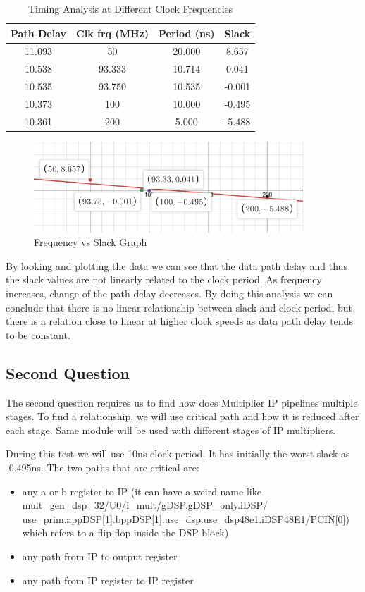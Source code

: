 \documentclass{report}
\begin{document}
\begin{table}[!h]
    \centering
    \caption{Timing Analysis at Different Clock Frequencies}
    \begin{tabular}{|c|c|c|c|}
    \hline
    \textbf{Path Delay} & \textbf{Clk frq (MHz)} & \textbf{Period (ns)} & \textbf{Slack} \\
    \hline
    11.093 & 50       & 20.000   & 8.657     \\
    10.538 & 93.333   & 10.714   & 0.041     \\
    10.535 & 93.750   & 10.535   & -0.001    \\
    10.373 & 100      & 10.000   & -0.495    \\
    10.361 & 200      & 5.000    & -5.488    \\
    \hline
    \end{tabular}
    \end{table}
    \begin{figure}[h!]
        \centering
        \includegraphics[width=0.9\textwidth]{images/delay_graph.png}
        \caption{Frequency vs Slack Graph}
        \label{fig:slack_freq_path}
    \end{figure}
By looking and plotting the data we can see that the data path delay and thus the slack values are not linearly related to the clock period.
As frequency increases, change of the path delay decreases.
By doing this analysis we can conclude that there is no linear relationship between slack and clock period, but there is a relation close to linear at higher clock speeds as data path delay tends to be constant.

\subsection{Second Question}
The second question requires us to find how does Multiplier IP pipelines multiple stages.
To find a relationship, we will use critical path and how it is reduced after each stage. Same module will be used with different stages of IP multipliers.

During this test we will use 10ns clock period. It has initially the worst slack as -0.495ns.
The two paths that are critical are:
\begin{itemize}
    \item any a or b register to IP (it can have a weird name like mult\_gen\_dsp\_32/U0/i\_mult/gDSP.gDSP\_only.iDSP/ use\_prim.appDSP[1].bppDSP[1].use\_dsp.use\_dsp48e1.iDSP48E1/PCIN[0]) which refers to a flip-flop inside the DSP block)
    \item any path from IP to output register 
    \item any path from IP register to IP register
\end{itemize}
\end{document}
